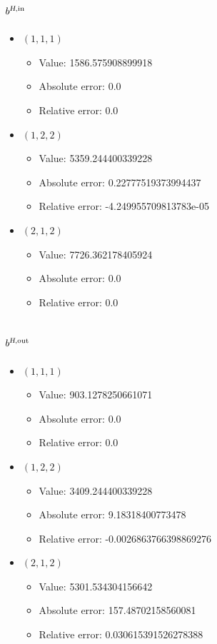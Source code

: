 \documentclass{article}%
\begin{document}
\subsection{$b^{\textsl{H},\text{in}}$}%
\begin{itemize}%
	\item $(1, 1, 1)$%
	\begin{itemize}%
		\item Value: 1586.575908899918%
		\item Absolute error: 0.0%
		\item Relative error: 0.0%
	\end{itemize}%
	\item $(1, 2, 2)$%
	\begin{itemize}%
		\item Value: 5359.244400339228%
		\item Absolute error: 0.22777519373994437%
		\item Relative error: -4.249955709813783e-05%
	\end{itemize}%
	\item $(2, 1, 2)$%
	\begin{itemize}%
		\item Value: 7726.362178405924%
		\item Absolute error: 0.0%
		\item Relative error: 0.0%
	\end{itemize}%
\end{itemize}%
\subsection{$b^{\textsl{H},\text{out}}$}%
\begin{itemize}%
	\item $(1, 1, 1)$%
	\begin{itemize}%
		\item Value: 903.1278250661071%
		\item Absolute error: 0.0%
		\item Relative error: 0.0%
	\end{itemize}%
	\item $(1, 2, 2)$%
	\begin{itemize}%
		\item Value: 3409.244400339228%
		\item Absolute error: 9.18318400773478%
		\item Relative error: -0.0026863766398869276%
	\end{itemize}%
	\item $(2, 1, 2)$%
	\begin{itemize}%
		\item Value: 5301.534304156642%
		\item Absolute error: 157.48702158560081%
		\item Relative error: 0.030615391526278388%
	\end{itemize}%
\end{itemize}%
\end{document}
